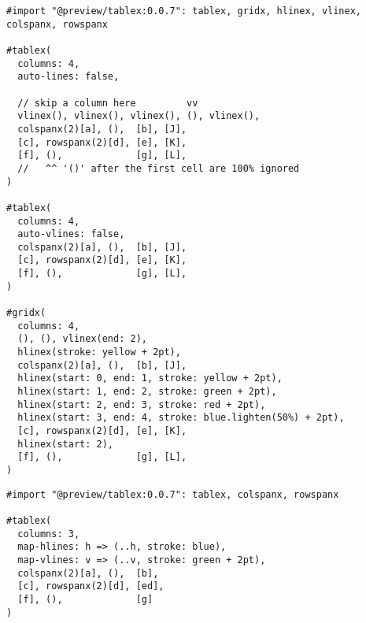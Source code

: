 \pandocbounded{}

\pandocbounded{}

\begin{verbatim}
#import "@preview/tablex:0.0.7": tablex, gridx, hlinex, vlinex, colspanx, rowspanx

#tablex(
  columns: 4,
  auto-lines: false,

  // skip a column here         vv
  vlinex(), vlinex(), vlinex(), (), vlinex(),
  colspanx(2)[a], (),  [b], [J],
  [c], rowspanx(2)[d], [e], [K],
  [f], (),             [g], [L],
  //   ^^ '()' after the first cell are 100% ignored
)

#tablex(
  columns: 4,
  auto-vlines: false,
  colspanx(2)[a], (),  [b], [J],
  [c], rowspanx(2)[d], [e], [K],
  [f], (),             [g], [L],
)

#gridx(
  columns: 4,
  (), (), vlinex(end: 2),
  hlinex(stroke: yellow + 2pt),
  colspanx(2)[a], (),  [b], [J],
  hlinex(start: 0, end: 1, stroke: yellow + 2pt),
  hlinex(start: 1, end: 2, stroke: green + 2pt),
  hlinex(start: 2, end: 3, stroke: red + 2pt),
  hlinex(start: 3, end: 4, stroke: blue.lighten(50%) + 2pt),
  [c], rowspanx(2)[d], [e], [K],
  hlinex(start: 2),
  [f], (),             [g], [L],
)
\end{verbatim}

\pandocbounded{}

\begin{verbatim}
#import "@preview/tablex:0.0.7": tablex, colspanx, rowspanx

#tablex(
  columns: 3,
  map-hlines: h => (..h, stroke: blue),
  map-vlines: v => (..v, stroke: green + 2pt),
  colspanx(2)[a], (),  [b],
  [c], rowspanx(2)[d], [ed],
  [f], (),             [g]
)
\end{verbatim}

\pandocbounded{}

